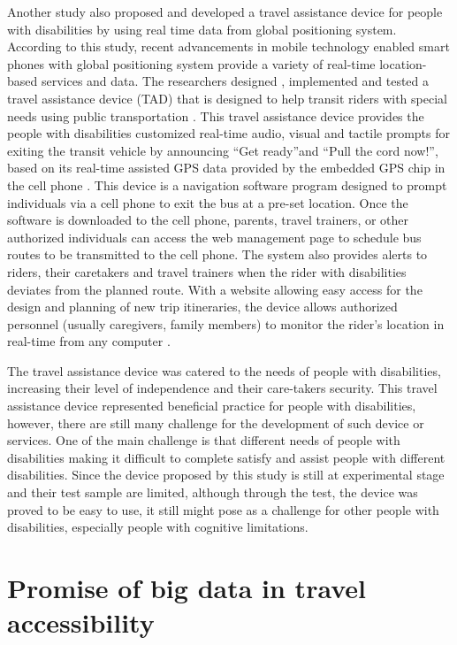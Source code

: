 Another study also proposed and developed a travel assistance device for people with disabilities by using real time data from global positioning system. According to this study, recent advancements in mobile technology enabled smart phones with global positioning system provide a variety of real-time location-based services and data. The researchers designed , implemented and tested a travel assistance device (TAD) that is designed to help transit riders with special needs using public transportation \cite{Barbeau}. This travel assistance device provides the people with disabilities customized real-time audio, visual and tactile prompts for exiting the transit vehicle by announcing ``Get ready''and ``Pull the cord now!'', based on  its real-time assisted GPS data provided by the embedded GPS chip in the cell phone \cite{Barbeau}.  This device is a
navigation software program designed to prompt individuals via a cell phone to exit the bus at a pre-set location. Once the software is downloaded to the cell phone,
parents, travel trainers, or other authorized individuals can access the web management
page to schedule bus routes to be transmitted to the cell phone.  The system also provides alerts to riders, their caretakers and travel trainers when the rider with disabilities deviates from the planned route. With a website allowing easy access for the design and planning of new trip itineraries, the device allows authorized personnel (usually caregivers, family members) to monitor the rider’s location in real-time from any computer \cite{Barbeau}. 

The travel assistance device was catered to the needs of people with disabilities, increasing their level of independence and their care-takers security. This travel assistance device represented beneficial practice for people with disabilities, however, there are still many challenge for the development of such device or services. One of the main challenge is that different needs of people with disabilities making it difficult to complete satisfy and assist people with different disabilities. Since the device proposed by this study is still at experimental stage and their test sample are limited, although through the test, the device was proved to be easy to use, it still might pose as a challenge for other people with disabilities, especially people with cognitive limitations. 


\section{Promise of big data in travel accessibility}
